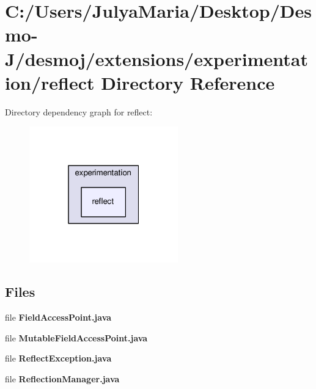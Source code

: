 \section{C\-:/\-Users/\-Julya\-Maria/\-Desktop/\-Desmo-\/\-J/desmoj/extensions/experimentation/reflect Directory Reference}
\label{dir_125b98f1cad17cf555acbb7b8759d58b}
Directory dependency graph for reflect\-:
\nopagebreak
\begin{figure}[H]
\begin{center}
\leavevmode
\includegraphics[width=182pt]{dir_125b98f1cad17cf555acbb7b8759d58b_dep}
\end{center}
\end{figure}
\subsection*{Files}
\begin{DoxyCompactItemize}
\item 
file {\bfseries Field\-Access\-Point.\-java}
\item 
file {\bfseries Mutable\-Field\-Access\-Point.\-java}
\item 
file {\bfseries Reflect\-Exception.\-java}
\item 
file {\bfseries Reflection\-Manager.\-java}
\end{DoxyCompactItemize}
